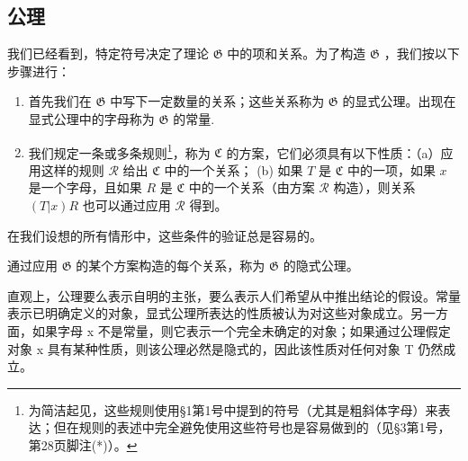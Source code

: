 \subsection{公理}

我们已经看到，特定符号决定了理论 \(\mathfrak{G}\) 中的项和关系。为了构造 \(\mathfrak{G}\) ，我们按以下步骤进行：

\begin{enumerate}
\def\labelenumi{(\arabic{enumi})}
\item
  首先我们在 \(\mathfrak{G}\) 中写下一定数量的关系；这些关系称为 \(\mathfrak{G}\) 的显式公理。出现在显式公理中的字母称为 \(\mathfrak{G}\) 的常量.
\item
  我们规定一条或多条规则\footnote{为简洁起见，这些规则使用§1第1号中提到的符号（尤其是粗斜体字母）来表达；但在规则的表述中完全避免使用这些符号也是容易做到的（见§3第1号，第28页脚注(*)）。}，称为 \(\mathfrak{C}\) 的方案，它们必须具有以下性质：（a）应用这样的规则 \(\mathcal{R}\) 给出 \(\mathfrak{C}\) 中的一个关系； (b) 如果 \(T\) 是 \(\mathfrak{C}\) 中的一项，如果 \(x\) 是一个字母，且如果 \(R\) 是 \(\mathfrak{C}\) 中的一个关系（由方案 \(\mathcal{R}\) 构造），则关系 \((T|x)R\) 也可以通过应用 \(\mathcal{R}\) 得到。
\end{enumerate}

在我们设想的所有情形中，这些条件的验证总是容易的。

通过应用 \(\mathfrak{G}\) 的某个方案构造的每个关系，称为 \(\mathfrak{G}\) 的隐式公理。

直观上，公理要么表示自明的主张，要么表示人们希望从中推出结论的假设。常量表示已明确定义的对象，显式公理所表达的性质被认为对这些对象成立。另一方面，如果字母 x 不是常量，则它表示一个完全未确定的对象；如果通过公理假定对象 x 具有某种性质，则该公理必然是隐式的，因此该性质对任何对象 T 仍然成立。

